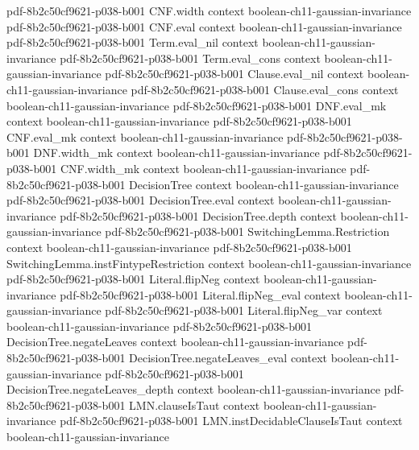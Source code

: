 \begin{theorem}
  {pdf-8b2c50cf9621-p038-b001}
\proofstep
  {CNF.width}
  {context}
  {boolean-ch11-gaussian-invariance}
  {pdf-8b2c50cf9621-p038-b001}
\proofstep
  {CNF.eval}
  {context}
  {boolean-ch11-gaussian-invariance}
  {pdf-8b2c50cf9621-p038-b001}
\proofstep
  {Term.eval_nil}
  {context}
  {boolean-ch11-gaussian-invariance}
  {pdf-8b2c50cf9621-p038-b001}
\proofstep
  {Term.eval_cons}
  {context}
  {boolean-ch11-gaussian-invariance}
  {pdf-8b2c50cf9621-p038-b001}
\proofstep
  {Clause.eval_nil}
  {context}
  {boolean-ch11-gaussian-invariance}
  {pdf-8b2c50cf9621-p038-b001}
\proofstep
  {Clause.eval_cons}
  {context}
  {boolean-ch11-gaussian-invariance}
  {pdf-8b2c50cf9621-p038-b001}
\proofstep
  {DNF.eval_mk}
  {context}
  {boolean-ch11-gaussian-invariance}
  {pdf-8b2c50cf9621-p038-b001}
\proofstep
  {CNF.eval_mk}
  {context}
  {boolean-ch11-gaussian-invariance}
  {pdf-8b2c50cf9621-p038-b001}
\proofstep
  {DNF.width_mk}
  {context}
  {boolean-ch11-gaussian-invariance}
  {pdf-8b2c50cf9621-p038-b001}
\proofstep
  {CNF.width_mk}
  {context}
  {boolean-ch11-gaussian-invariance}
  {pdf-8b2c50cf9621-p038-b001}
\proofstep
  {DecisionTree}
  {context}
  {boolean-ch11-gaussian-invariance}
  {pdf-8b2c50cf9621-p038-b001}
\proofstep
  {DecisionTree.eval}
  {context}
  {boolean-ch11-gaussian-invariance}
  {pdf-8b2c50cf9621-p038-b001}
\proofstep
  {DecisionTree.depth}
  {context}
  {boolean-ch11-gaussian-invariance}
  {pdf-8b2c50cf9621-p038-b001}
\proofstep
  {SwitchingLemma.Restriction}
  {context}
  {boolean-ch11-gaussian-invariance}
  {pdf-8b2c50cf9621-p038-b001}
\proofstep
  {SwitchingLemma.instFintypeRestriction}
  {context}
  {boolean-ch11-gaussian-invariance}
  {pdf-8b2c50cf9621-p038-b001}
\proofstep
  {Literal.flipNeg}
  {context}
  {boolean-ch11-gaussian-invariance}
  {pdf-8b2c50cf9621-p038-b001}
\proofstep
  {Literal.flipNeg_eval}
  {context}
  {boolean-ch11-gaussian-invariance}
  {pdf-8b2c50cf9621-p038-b001}
\proofstep
  {Literal.flipNeg_var}
  {context}
  {boolean-ch11-gaussian-invariance}
  {pdf-8b2c50cf9621-p038-b001}
\proofstep
  {DecisionTree.negateLeaves}
  {context}
  {boolean-ch11-gaussian-invariance}
  {pdf-8b2c50cf9621-p038-b001}
\proofstep
  {DecisionTree.negateLeaves_eval}
  {context}
  {boolean-ch11-gaussian-invariance}
  {pdf-8b2c50cf9621-p038-b001}
\proofstep
  {DecisionTree.negateLeaves_depth}
  {context}
  {boolean-ch11-gaussian-invariance}
  {pdf-8b2c50cf9621-p038-b001}
\proofstep
  {LMN.clauseIsTaut}
  {context}
  {boolean-ch11-gaussian-invariance}
  {pdf-8b2c50cf9621-p038-b001}
\proofstep
  {LMN.instDecidableClauseIsTaut}
  {context}
  {boolean-ch11-gaussian-invariance}

\end{theorem}
